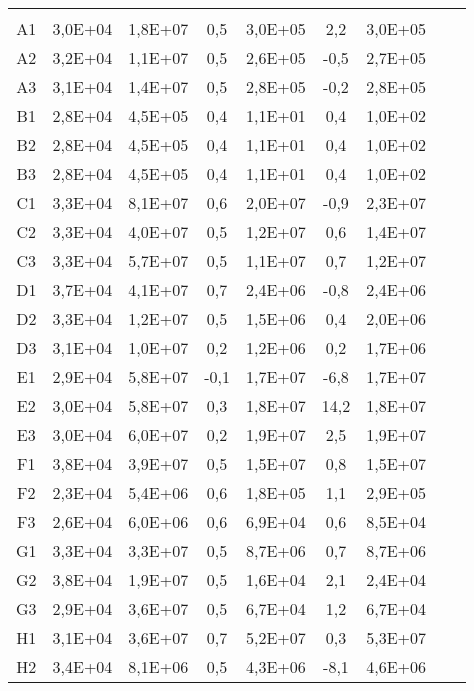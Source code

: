 \begin{center}
\begin{longtable}{ccccccccc}
\toprule
\endhead
\midrule \\ %
\endfoot
\bottomrule 
\endlastfoot
A1    & 3,0E+04 & 1,8E+07 & 0,5   & 3,0E+05 & 2,2   & 3,0E+05 \\
A2    & 3,2E+04 & 1,1E+07 & 0,5   & 2,6E+05 & -0,5  & 2,7E+05 \\
A3    & 3,1E+04 & 1,4E+07 & 0,5   & 2,8E+05 & -0,2  & 2,8E+05 \\
B1    & 2,8E+04 & 4,5E+05 & 0,4   & 1,1E+01 & 0,4   & 1,0E+02 \\
B2    & 2,8E+04 & 4,5E+05 & 0,4   & 1,1E+01 & 0,4   & 1,0E+02 \\
B3    & 2,8E+04 & 4,5E+05 & 0,4   & 1,1E+01 & 0,4   & 1,0E+02 \\
C1    & 3,3E+04 & 8,1E+07 & 0,6   & 2,0E+07 & -0,9  & 2,3E+07 \\
C2    & 3,3E+04 & 4,0E+07 & 0,5   & 1,2E+07 & 0,6   & 1,4E+07 \\
C3    & 3,3E+04 & 5,7E+07 & 0,5   & 1,1E+07 & 0,7   & 1,2E+07 \\
D1    & 3,7E+04 & 4,1E+07 & 0,7   & 2,4E+06 & -0,8  & 2,4E+06 \\
D2    & 3,3E+04 & 1,2E+07 & 0,5   & 1,5E+06 & 0,4   & 2,0E+06 \\
D3    & 3,1E+04 & 1,0E+07 & 0,2   & 1,2E+06 & 0,2   & 1,7E+06 \\
E1    & 2,9E+04 & 5,8E+07 & -0,1  & 1,7E+07 & -6,8  & 1,7E+07 \\
E2    & 3,0E+04 & 5,8E+07 & 0,3   & 1,8E+07 & 14,2  & 1,8E+07 \\
E3    & 3,0E+04 & 6,0E+07 & 0,2   & 1,9E+07 & 2,5   & 1,9E+07 \\
F1    & 3,8E+04 & 3,9E+07 & 0,5   & 1,5E+07 & 0,8   & 1,5E+07 \\
F2    & 2,3E+04 & 5,4E+06 & 0,6   & 1,8E+05 & 1,1   & 2,9E+05 \\
F3    & 2,6E+04 & 6,0E+06 & 0,6   & 6,9E+04 & 0,6   & 8,5E+04 \\
G1    & 3,3E+04 & 3,3E+07 & 0,5   & 8,7E+06 & 0,7   & 8,7E+06 \\
G2    & 3,8E+04 & 1,9E+07 & 0,5   & 1,6E+04 & 2,1   & 2,4E+04 \\
G3    & 2,9E+04 & 3,6E+07 & 0,5   & 6,7E+04 & 1,2   & 6,7E+04 \\
H1    & 3,1E+04 & 3,6E+07 & 0,7   & 5,2E+07 & 0,3   & 5,3E+07 \\
H2    & 3,4E+04 & 8,1E+06 & 0,5   & 4,3E+06 & -8,1  & 4,6E+06 \\

\end{longtable}
\end{center}
